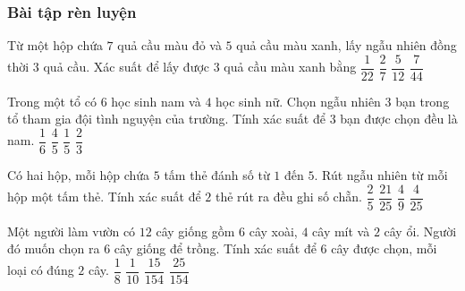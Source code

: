 \subsubsection{Bài tập rèn luyện}
\begin{bt}
	Từ một hộp chứa $7$ quả cầu màu đỏ và $5$ quả cầu màu xanh, lấy ngẫu nhiên đồng thời $3$ quả cầu. Xác suất để lấy được $3$ quả cầu màu xanh bằng
	\choice
	{\True$ \dfrac{1}{22} $}
	{$ \dfrac{2}{7} $}
	{$ \dfrac{5}{12} $}
	{$ \dfrac{7}{44} $}
\end{bt}
\begin{bt}
	Trong một tổ có $6$ học sinh nam và $4$ học sinh nữ. Chọn ngẫu nhiên $3$ bạn trong tổ tham gia đội tình nguyện của trường. Tính xác suất để $3$ bạn được chọn đều là nam.
	\choice
	{\True $ \dfrac{1}{6} $}
	{$ \dfrac{4}{5} $}
	{$ \dfrac{1}{5} $}
	{$ \dfrac{2}{3} $}
\end{bt}
\begin{bt}
	Có hai hộp, mỗi hộp chứa $5$ tấm thẻ đánh số từ $1$ đến $5$. Rút ngẫu nhiên từ mỗi hộp một tấm thẻ. Tính xác suất để $2$ thẻ rút ra đều ghi số chẵn.
	\choice
	{$ \dfrac{2}{5} $}
	{$ \dfrac{21}{25} $}
	{$ \dfrac{4}{9} $}
	{\True $ \dfrac{4}{25} $}
\end{bt}
\begin{bt}
	Một người làm vườn có $12$ cây giống gồm $6$ cây xoài, $4$ cây mít và $2$ cây ổi. Người đó muốn chọn ra $6$ cây giống để trồng. Tính xác suất để $6$ cây được chọn, mỗi loại có đúng $2$ cây.
	\choice
	{$ \dfrac{1}{8} $}
	{$ \dfrac{1}{10} $}
	{\True$ \dfrac{15}{154} $}
	{$ \dfrac{25}{154} $}
\end{bt}
